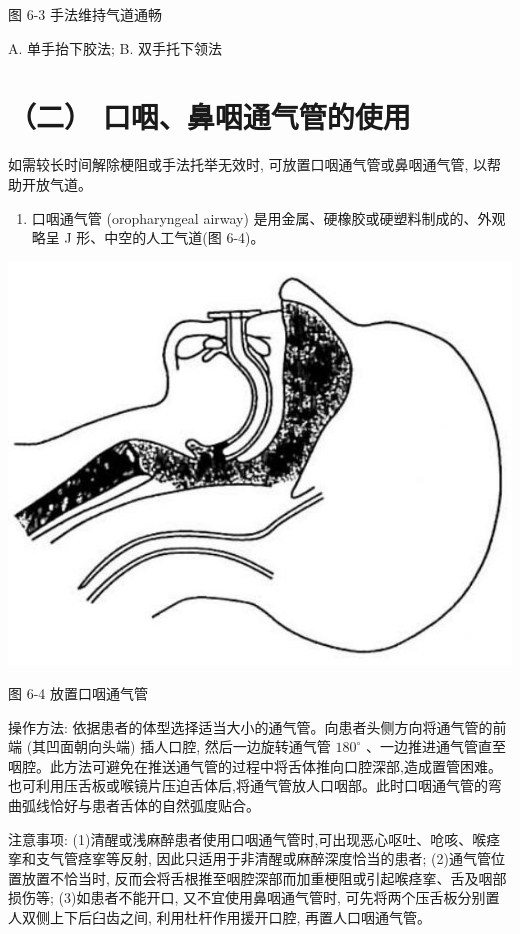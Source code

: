 \documentclass[10pt]{article}
\begin{document}
图 6-3 手法维持气道通畅

A. 单手抬下㬵法; B. 双手托下领法

\section*{（二） 口咽、鼻咽通气管的使用}
如需较长时间解除梗阻或手法托举无效时, 可放置口咽通气管或鼻咽通气管, 以帮助开放气道。

\begin{enumerate}
  \item 口咽通气管 (oropharyngeal airway) 是用金属、硬橡胶或硬塑料制成的、外观略呈 J 形、中空的人工气道(图 6-4)。
\end{enumerate}

\begin{center}
\includegraphics[max width=\textwidth]{2024_07_09_002a177993bd97d1d6d7g-086}
\end{center}

图 6-4 放置口咽通气管

操作方法: 依据患者的体型选择适当大小的通气管。向患者头侧方向将通气管的前端 (其凹面朝向头端) 插人口腔, 然后一边旋转通气管 $180^{\circ}$ 、一边推进通气管直至咽腔。此方法可避免在推送通气管的过程中将舌体推向口腔深部,造成置管困难。也可利用压舌板或喉镜片压迫舌体后,将通气管放人口咽部。此时口咽通气管的弯曲弧线恰好与患者舌体的自然弧度贴合。

注意事项: (1)清醒或浅麻醉患者使用口咽通气管时,可出现恶心呕吐、呛咳、喉痉挛和支气管痉挛等反射, 因此只适用于非清醒或麻醉深度恰当的患者; (2)通气管位置放置不恰当时, 反而会将舌根推至咽腔深部而加重梗阻或引起喉痉挛、舌及咽部损伤等; (3)如患者不能开口, 又不宜使用鼻咽通气管时, 可先将两个压舌板分别置人双侧上下后臼齿之间, 利用杜杆作用援开口腔, 再置人口咽通气管。
\end{document}

